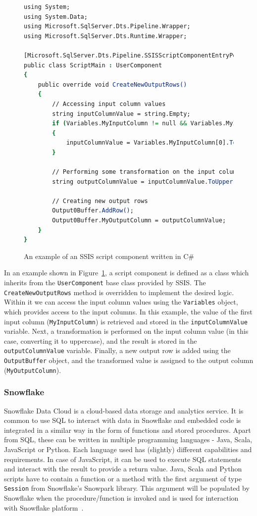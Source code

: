 \begin{figure}[ht]
\begin{lstlisting}[language=csh]
using System;
using System.Data;
using Microsoft.SqlServer.Dts.Pipeline.Wrapper;
using Microsoft.SqlServer.Dts.Runtime.Wrapper;

[Microsoft.SqlServer.Dts.Pipeline.SSISScriptComponentEntryPointAttribute]
public class ScriptMain : UserComponent
{
    public override void CreateNewOutputRows()
    {
        // Accessing input column values
        string inputColumnValue = string.Empty;
        if (Variables.MyInputColumn != null && Variables.MyInputColumn.Length > 0)
        {
            inputColumnValue = Variables.MyInputColumn[0].ToString();
        }

        // Performing some transformation on the input column value
        string outputColumnValue = inputColumnValue.ToUpper();

        // Creating new output rows
        Output0Buffer.AddRow();
        Output0Buffer.MyOutputColumn = outputColumnValue;
    }
}
\end{lstlisting}
\caption{An example of an SSIS script component written in C\#}
\label{fig:cSharpScript}
\end{figure}

\par
In an example shown in Figure~\ref{fig:cSharpScript}, a script component is defined as a class which inherits from the \texttt{UserComponent} base class provided by SSIS. The \texttt{CreateNewOutputRows} method is overridden to implement the desired logic. Within it we can access the input column values using the \texttt{Variables} object, which provides access to the input columns. In this example, the value of the first input column (\texttt{MyInputColumn}) is retrieved and stored in the \texttt{inputColumnValue} variable. Next, a transformation is performed on the input column value (in this case, converting it to uppercase), and the result is stored in the \texttt{outputColumnValue} variable. Finally, a new output row is added using the \texttt{OutputBuffer} object, and the transformed value is assigned to the output column (\texttt{MyOutputColumn}).

\subsubsection{Snowflake}
Snowflake Data Cloud is a cloud-based data storage and analytics service. It is common to use SQL to interact with data in Snowflake and embedded code is integrated in a similar way in the form of functions and stored procedures. Apart from SQL, these can be written in multiple programming languages - Java, Scala, JavaScript or Python. Each language used has (slightly) different capabilities and requirements. In case of JavaScript, it can be used to execute SQL statements and interact with the result to provide a return value. Java, Scala and Python scripts have to contain a function or a method with the first argument of type \texttt{Session} from Snowflake's Snowpark library. This argument will be populated by Snowflake when the procedure/function is invoked and is used for interaction with Snowflake platform~\cite{snowflake}.


